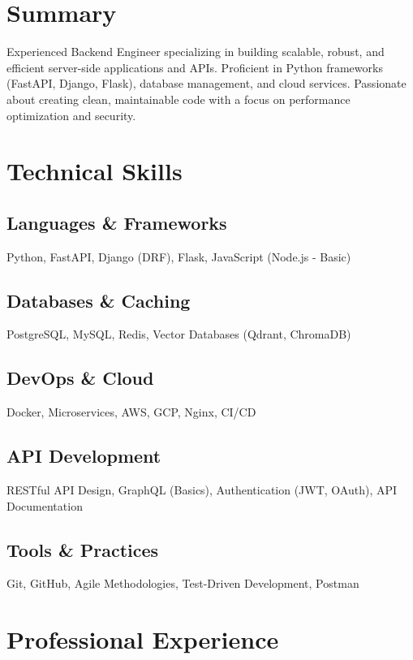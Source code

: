 \documentclass[11pt,a4paper,sans]{moderncv}
\begin{document}
\makecvtitle

\section{Summary}
Experienced Backend Engineer specializing in building scalable, robust, and efficient server-side applications and APIs. Proficient in Python frameworks (FastAPI, Django, Flask), database management, and cloud services. Passionate about creating clean, maintainable code with a focus on performance optimization and security.

\section{Technical Skills}
\subsection{Languages \& Frameworks}
Python, FastAPI, Django (DRF), Flask, JavaScript (Node.js - Basic)

\subsection{Databases \& Caching}
PostgreSQL, MySQL, Redis, Vector Databases (Qdrant, ChromaDB)

\subsection{DevOps \& Cloud}
Docker, Microservices, AWS, GCP, Nginx, CI/CD

\subsection{API Development}
RESTful API Design, GraphQL (Basics), Authentication (JWT, OAuth), API Documentation

\subsection{Tools \& Practices}
Git, GitHub, Agile Methodologies, Test-Driven Development, Postman

\section{Professional Experience}
\end{document}
